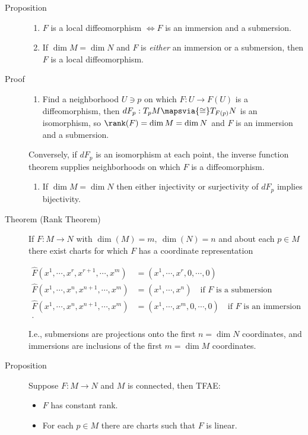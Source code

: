 \begin{description}
\item[Proposition]
\hfill

\begin{enumerate}
\def\labelenumi{\arabic{enumi}.}
\tightlist
\item
  \(F\) is a local diffeomorphism \(\iff F\) is an immersion and a
  submersion.
\item
  If \(\dim M = \dim N\) and \(F\) is \emph{either} an immersion or a
  submersion, then \(F\) is a local diffeomorphism.
\end{enumerate}
\item[Proof]
\hfill

\begin{enumerate}
\def\labelenumi{\arabic{enumi}.}
\tightlist
\item
  Find a neighborhood \(U\ni p\) on which \(F: U \to F(U)\) is a
  diffeomorphism, then \(dF_p: T_p M \mapsvia{\cong} T_{F(p)}N\) is an
  isomorphism, so \(\rank(F) = \dim M = \dim N\) and \(F\) is an
  immersion and a submersion.
\end{enumerate}

Conversely, if \(dF_p\) is an isomorphism at each point, the inverse
function theorem supplies neighborhoods on which \(F\) is a
diffeomorphism.

\begin{enumerate}
\def\labelenumi{\arabic{enumi}.}
\setcounter{enumi}{1}
\tightlist
\item
  If \(\dim M = \dim N\) then either injectivity or surjectivity of
  \(dF_p\) implies bijectivity.
\end{enumerate}
\item[Theorem (Rank Theorem)]
If \(F:M\to N\) with \(\dim(M) = m,~\dim(N) = n\) and about each
\(p\in M\) there exist charts for which \(F\) has a coordinate
representation

\begin{align*}
\hat F(x^1, \cdots, x^r, x^{r+1}, \cdots, x^m) &= (x^1, \cdots, x^r, 0, \cdots, 0) \\
\hat F(x^1, \cdots, x^n, x^{n+1}, \cdots, x^m) &= (x^1, \cdots, x^n) \quad\text{if $F$ is a submersion} \\
\hat F(x^1, \cdots, x^n, x^{n+1}, \cdots, x^m) &= (x^1, \cdots, x^m, 0, \cdots, 0) \quad\text{if $F$ is an immersion}\\
.\end{align*}

I.e., submersions are projections onto the first \(n = \dim N\)
coordinates, and immersions are inclusions of the first \(m=\dim M\)
coordinates.
\item[Proposition]
Suppose \(F:M\to N\) and \(M\) is connected, then TFAE:

\begin{itemize}
\tightlist
\item
  \(F\) has constant rank.
\item
  For each \(p\in M\) there are charts such that \(F\) is linear.
\end{itemize}
\end{description}

